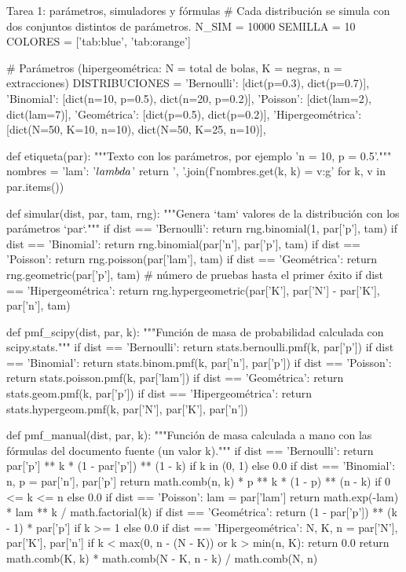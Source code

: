 \documentclass[11pt,letterpaper]{article}
\begin{document}
\begin{codigo}[label=cod:t1]{Tarea 1: parámetros, simuladores y fórmulas}
# Cada distribución se simula con dos conjuntos distintos de parámetros.
N_SIM = 10000
SEMILLA = 10
COLORES = ['tab:blue', 'tab:orange']

# Parámetros (hipergeométrica: N = total de bolas, K = negras, n = extracciones)
DISTRIBUCIONES = {
    'Bernoulli':      [dict(p=0.3), dict(p=0.7)],
    'Binomial':       [dict(n=10, p=0.5), dict(n=20, p=0.2)],
    'Poisson':        [dict(lam=2), dict(lam=7)],
    'Geométrica':     [dict(p=0.5), dict(p=0.2)],
    'Hipergeométrica': [dict(N=50, K=10, n=10), dict(N=50, K=25, n=10)],
}


def etiqueta(par):
    """Texto con los parámetros, por ejemplo 'n = 10, p = 0.5'."""
    nombres = {'lam': '$\\lambda$'}
    return ', '.join(f'{nombres.get(k, k)} = {v:g}' for k, v in par.items())


def simular(dist, par, tam, rng):
    """Genera `tam` valores de la distribución con los parámetros `par`."""
    if dist == 'Bernoulli':
        return rng.binomial(1, par['p'], tam)
    if dist == 'Binomial':
        return rng.binomial(par['n'], par['p'], tam)
    if dist == 'Poisson':
        return rng.poisson(par['lam'], tam)
    if dist == 'Geométrica':
        return rng.geometric(par['p'], tam)  # número de pruebas hasta el primer éxito
    if dist == 'Hipergeométrica':
        return rng.hypergeometric(par['K'], par['N'] - par['K'], par['n'], tam)


def pmf_scipy(dist, par, k):
    """Función de masa de probabilidad calculada con scipy.stats."""
    if dist == 'Bernoulli':
        return stats.bernoulli.pmf(k, par['p'])
    if dist == 'Binomial':
        return stats.binom.pmf(k, par['n'], par['p'])
    if dist == 'Poisson':
        return stats.poisson.pmf(k, par['lam'])
    if dist == 'Geométrica':
        return stats.geom.pmf(k, par['p'])
    if dist == 'Hipergeométrica':
        return stats.hypergeom.pmf(k, par['N'], par['K'], par['n'])


def pmf_manual(dist, par, k):
    """Función de masa calculada a mano con las fórmulas del documento fuente (un valor k)."""
    if dist == 'Bernoulli':
        return par['p'] ** k * (1 - par['p']) ** (1 - k) if k in (0, 1) else 0.0
    if dist == 'Binomial':
        n, p = par['n'], par['p']
        return math.comb(n, k) * p ** k * (1 - p) ** (n - k) if 0 <= k <= n else 0.0
    if dist == 'Poisson':
        lam = par['lam']
        return math.exp(-lam) * lam ** k / math.factorial(k)
    if dist == 'Geométrica':
        return (1 - par['p']) ** (k - 1) * par['p'] if k >= 1 else 0.0
    if dist == 'Hipergeométrica':
        N, K, n = par['N'], par['K'], par['n']
        if k < max(0, n - (N - K)) or k > min(n, K):
            return 0.0
        return math.comb(K, k) * math.comb(N - K, n - k) / math.comb(N, n)



\end{codigo}
\end{document}
